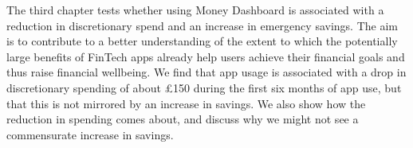 The
third chapter tests whether using Money Dashboard is associated
with a reduction in discretionary spend and an increase in emergency savings.
The aim is to contribute to a better understanding of the extent to which the
potentially large benefits of FinTech apps already help users achieve their
financial goals and thus raise financial wellbeing. {\color{blue} We find that app usage is associated with a drop in discretionary spending of about \pounds150 during the first six months of app use, but that this is not mirrored by an increase in savings. We also show how the reduction in spending comes about, and discuss why we might not see a commensurate increase in savings.}
